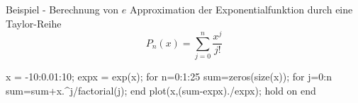 \documentclass[hyperref={xetex}]{beamer}
\begin{document}

%
%
%


\begin{frame}[fragile]{Beispiel - Berechnung von $e$}
Approximation der Exponentialfunktion durch eine Taylor-Reihe
\begin{equation*}
 P_n(x) = \sum_{j=0}^n\frac{x^j}{j!} 
\end{equation*}

\begin{matlabin}
x = -10:0.01:10; %
expx = exp(x); %
for n=0:1:25
    sum=zeros(size(x));     
    for j=0:n
        sum=sum+x.^j/factorial(j); 
    end
    plot(x,(sum-expx)./expx); 
    hold on 
end
\end{matlabin}

\end{frame}
\end{document}
